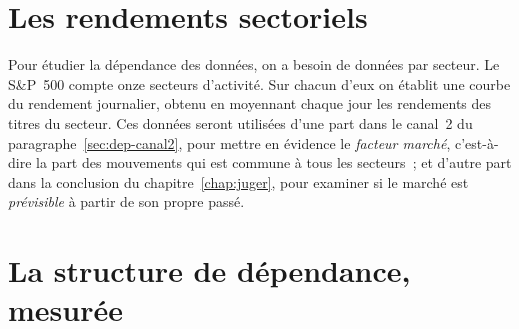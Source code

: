 \section{Les rendements sectoriels}
\label{sec:donnees-secteurs}


Pour étudier la dépendance des données, on a besoin de données
par secteur.
Le S\&P~500 compte onze secteurs d'activité. Sur chacun d'eux on établit
une courbe du rendement journalier, obtenu en moyennant chaque jour les
rendements des titres du secteur.
Ces données seront utilisées d'une part dans le canal~2 du
paragraphe~\ref{sec:dep-canal2}, pour mettre en évidence le \emph{facteur
marché}, c'est-à-dire la part des mouvements qui est commune à tous les
secteurs~; et d'autre part dans la conclusion du chapitre~\ref{chap:juger},
pour examiner si le marché est \emph{prévisible} à partir de son propre passé.



\section{La structure de dépendance, mesurée}
\label{sec:dep-mesuree}


